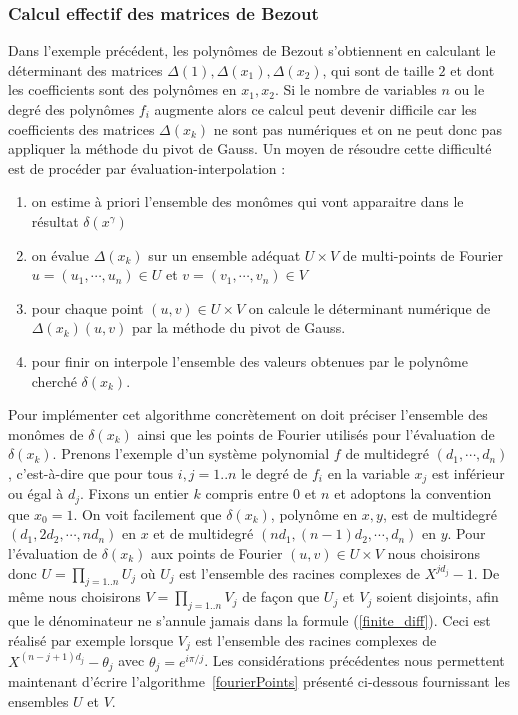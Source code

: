 \documentclass{standalone}
\begin{document}
\subsubsection{Calcul effectif des matrices de Bezout}
Dans l'exemple précédent, les polynômes de Bezout s'obtiennent en calculant le déterminant des matrices $\Delta(1), \Delta(x_1), \Delta(x_2)$, qui sont de taille $2$ et dont les coefficients sont des polynômes en $x_1, x_2$. Si le nombre de variables $n$ ou le degré des polynômes $f_i$ augmente alors ce calcul peut devenir difficile car les coefficients des matrices $\Delta(x_k)$ ne sont pas numériques et on ne peut donc pas appliquer la méthode du pivot de Gauss. Un moyen de résoudre cette difficulté est de procéder par évaluation-interpolation :
\begin{enumerate}
\item
on estime à priori l'ensemble des monômes qui vont apparaitre dans le résultat $\delta(x^\gamma)$
\item
on évalue $\Delta(x_k)$ sur un ensemble adéquat $U \times V$ de multi-points de Fourier $u = (u_1,\cdots, u_n) \in U$ et $v = (v_1,\cdots, v_n) \in V$
\item
pour chaque point $(u, v) \in U\times V$ on calcule le déterminant numérique de $\Delta(x_k)(u, v)$ par la méthode du pivot de Gauss.
\item
pour finir on interpole l'ensemble des valeurs obtenues par le polynôme cherché $\delta(x_k)$.
\end{enumerate}
Pour implémenter cet algorithme concrètement on doit préciser l'ensemble des monômes de $\delta(x_k)$ ainsi que les points de Fourier utilisés pour l'évaluation de $\delta(x_k)$. Prenons l'exemple d'un système polynomial $f$ de multidegré $(d_1, \cdots, d_n)$, c'est-à-dire que pour tous $i, j = 1..n$ le degré de $f_i$ en la variable $x_j$ est inférieur ou égal à $d_j$. Fixons un entier $k$ compris entre $0$ et $n$ et adoptons la convention que $x_0 = 1$. On voit facilement que $\delta(x_k)$, polynôme en $x, y$, est de multidegré $(d_1, 2d_2, \cdots, nd_n)$ en $x$ et de multidegré $(nd_1, (n-1)d_2, \cdots, d_n)$ en $y$.
 Pour l'évaluation de $\delta(x_k)$ aux points de Fourier $(u, v) \in U\times V$ nous choisirons donc $U = \prod_{j=1..n} U_j$ o\`u $U_j$ est l'ensemble des racines complexes de $X^{jd_j} - 1$. De même nous choisirons $V = \prod_{j=1..n} V_j$ de façon que $U_j$ et $V_j$ soient disjoints, afin que le dénominateur ne s'annule jamais dans la formule (\ref{finite_diff}). Ceci est réalisé par exemple lorsque $V_j$ est l'ensemble des racines complexes de $X^{(n-j+1)d_j} - \theta_j$ avec $\theta_j = e^{i\pi/j}$. Les considérations précédentes nous permettent maintenant d'écrire l'algorithme~\ref{fourierPoints} présenté ci-dessous fournissant les ensembles $U$ et $V$.
\end{document}
